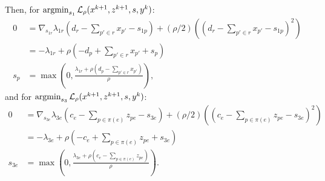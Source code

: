 \documentclass[11pt]{article}
\begin{document}
Then, for $\operatorname*{argmin}_{s_1} \mathcal{L}_\rho(x^{k+1},z^{k+1},s,y^k)$:
\begin{align*}
0
&= \nabla_{s_{1r}}\lambda_{1r}(d_r - \sum_{p'\in r}x_{p'} - s_{1p})
    + (\rho/2)((d_r - \sum_{p'\in r}x_{p'} - s_{1p})^2)\\
&= -\lambda_{1r} + \rho(-d_p + \sum_{p'\in r}x_{p'} + s_p)\\
s_{p} &= \max(0,\frac{\lambda_{1r} + \rho(d_p - \sum_{p'\in r}x_{p'})}{\rho}),
\end{align*}
and for $\operatorname*{argmin}_{s_3} \mathcal{L}_\rho(x^{k+1},z^{k+1},s,y^k)$:
\begin{align*}
0
&= \nabla_{s_{3e}} \lambda_{3e}(c_e - \sum_{p\in\pi(e)} z_{pe} - s_{3e})
    + (\rho/2)((c_e - \sum_{p\in\pi(e)} z_{pe} - s_{3e})^2)\\
&= -\lambda_{3e} + \rho(-c_e + \sum_{p\in\pi(e)} z_{pe} + s_{3e})\\
s_{3e} &= \max(0,\frac{\lambda_{3e} + \rho(c_e - \sum_{p\in\pi(e)}z_{pe})}{\rho}).
\end{align*}
\end{document}
